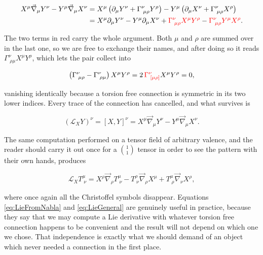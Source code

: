         \begin{align*}
            X^{\mu}\Vec{\nabla}_{\mu}Y^{\nu} - Y^{\mu}\Vec{\nabla}_{\mu}X^{\nu} &= X^{\mu}\left(\partial_{\mu}Y^{\nu} + \Gamma^{\nu}_{\;\mu\rho}Y^{\rho}\right) - Y^{\mu}\left(\partial_{\mu}X^{\nu} + \Gamma^{\nu}_{\;\mu\rho}X^{\rho}\right)\\
            &= X^{\mu}\partial_{\mu}Y^{\nu} - Y^{\mu}\partial_{\mu}X^{\nu} + {\color{red}\Gamma^{\nu}_{\;\mu\rho}X^{\mu}Y^{\rho}} - {\color{red}\Gamma^{\nu}_{\;\mu\rho}Y^{\mu}X^{\rho}}.
        \end{align*}

        The two terms in red carry the whole argument. Both $\mu$ and $\rho$ are summed over in the last one, so we are free to exchange their names, and after doing so it reads $\Gamma^{\nu}_{\;\rho\mu}X^{\mu}Y^{\rho}$, which lets the pair collect into

        \begin{align*}
            \left(\Gamma^{\nu}_{\;\mu\rho} - \Gamma^{\nu}_{\;\rho\mu}\right)X^{\mu}Y^{\rho} = 2\,{\color{red}\Gamma^{\nu}_{\;[\mu\rho]}}X^{\mu}Y^{\rho} = 0,
        \end{align*}

        vanishing identically because a torsion free connection is symmetric in its two lower indices. Every trace of the connection has cancelled, and what survives is

        \begin{equation}\label{eq:LieFromNabla}
            \left(\mathcal{L}_XY\right)^{\nu} = \left[X,Y\right]^{\nu} = X^{\mu}\Vec{\nabla}_{\mu}Y^{\nu} - Y^{\mu}\Vec{\nabla}_{\mu}X^{\nu}.
        \end{equation}

        The same computation performed on a tensor field of arbitrary valence, and the reader should carry it out once for a $\binom{1}{1}$ tensor in order to see the pattern with their own hands, produces

        \begin{equation}\label{eq:LieGeneral}
            \mathcal{L}_XT^{\mu}_{\;\nu} = X^{\rho}\Vec{\nabla}_{\rho}T^{\mu}_{\;\nu} - T^{\rho}_{\;\nu}\Vec{\nabla}_{\rho}X^{\mu} + T^{\mu}_{\;\rho}\Vec{\nabla}_{\nu}X^{\rho},
        \end{equation}

        where once again all the Christoffel symbols disappear. Equations \ref{eq:LieFromNabla} and \ref{eq:LieGeneral} are genuinely useful in practice, because they say that we may compute a Lie derivative with whatever torsion free connection happens to be convenient and the result will not depend on which one we chose. That independence is exactly what we should demand of an object which never needed a connection in the first place.

